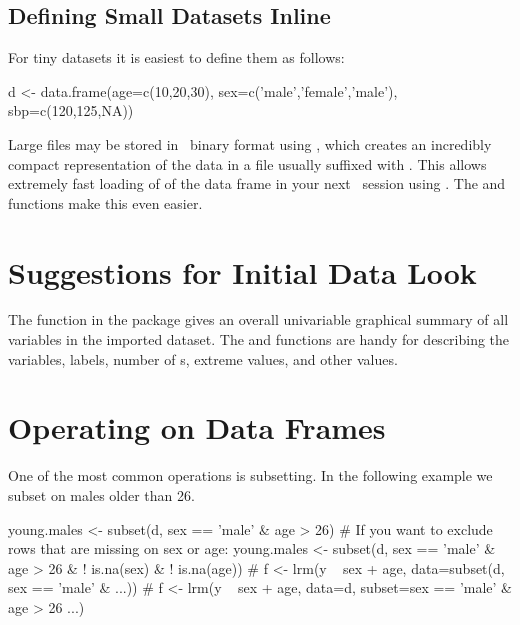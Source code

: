 \subsection{Defining Small Datasets Inline}
For tiny datasets it is easiest to define them as follows:
\begin{Schunk}
\begin{Sinput}
d <- data.frame(age=c(10,20,30), sex=c('male','female','male'),
                sbp=c(120,125,NA))
\end{Sinput}
\end{Schunk}

Large files may be stored in \R\ binary format using , which creates an incredibly compact representation
of the data in a file usually suffixed with .  This allows
extremely fast loading of of the data frame in your next \R\ session
using .  The   and 
functions make this even easier.

\section{Suggestions for Initial Data Look}
The  function in the  package gives an
overall univariable graphical summary of all variables in the imported
dataset.  The  and  functions are handy for
describing the variables, labels, number of s, extreme values,
and other values.

\section{Operating on Data Frames}
One of the most common operations is subsetting.  In the following
example we subset on males older than 26.
\begin{Schunk}
\begin{Sinput}
young.males <- subset(d, sex == 'male' & age > 26)
# If you want to exclude rows that are missing on sex or age:
young.males <- subset(d, sex == 'male' & age > 26 & ! is.na(sex) &
                        ! is.na(age))
# f <- lrm(y ~ sex + age, data=subset(d, sex == 'male' & ...))
# f <- lrm(y ~ sex + age, data=d, subset=sex == 'male' & age > 26 ...)
\end{Sinput}
\end{Schunk}
